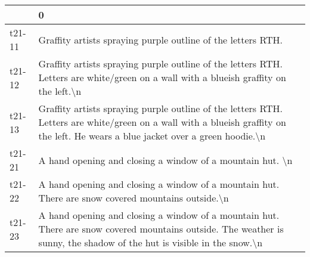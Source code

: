 \begin{tabular}{ll}
\toprule
{} &                                                                                                                                                                                                                                                                                                            0 \\
\midrule
t21-11 &                                                                                                                                                                                                                                                 Graffity artists spraying purple outline of the letters RTH. \\
t21-12 &                                                                                                                                                                        Graffity artists spraying purple outline of the letters RTH. Letters are white/green on a wall with a blueish graffity on the left.\textbackslash n \\
t21-13 &                                                                                                                            Graffity artists spraying purple outline of the letters RTH. Letters are white/green on a wall with a blueish graffity on the left. He wears a blue jacket over a green hoodie.\textbackslash n \\
t21-21 &                                                                                                                                                                                                                                                    A hand opening and closing a window of a mountain hut. \textbackslash n \\
t21-22 &                                                                                                                                                                                                           A hand opening and closing a window of a mountain hut. There are snow covered mountains outside.\textbackslash n \\
t21-23 &                                                                                                                                       A hand opening and closing a window of a mountain hut. There are snow covered mountains outside. The weather is sunny, the shadow of the hut is visible in the snow.\textbackslash n \\

\end{tabular}
